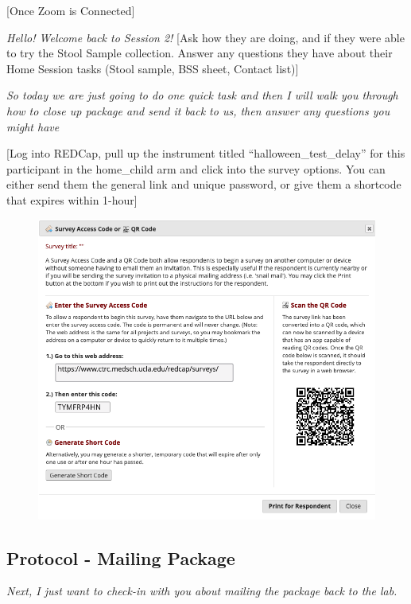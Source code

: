 \documentclass[]{book}
\begin{document}
{[}Once Zoom is Connected{]}

\emph{Hello! Welcome back to Session 2!} {[}Ask how they are doing, and if they were able to try the Stool Sample collection. Answer any questions they have about their Home Session tasks (Stool sample, BSS sheet, Contact list){]}

\emph{So today we are just going to do one quick task and then I will walk you through how to close up package and send it back to us, then answer any questions you might have}

{[}Log into REDCap, pull up the instrument titled ``halloween\_test\_delay'' for this participant in the home\_child arm and click into the survey options. You can either send them the general link and unique password, or give them a shortcode that expires within 1-hour{]}

\begin{figure}
\centering
\includegraphics{images/halloween/8.png}
\caption{}
\end{figure}

\hypertarget{protocol---mailing-package}{%
\subsection{Protocol - Mailing Package}\label{protocol---mailing-package}}

\emph{Next, I just want to check-in with you about mailing the package back to the lab.}
\end{document}
